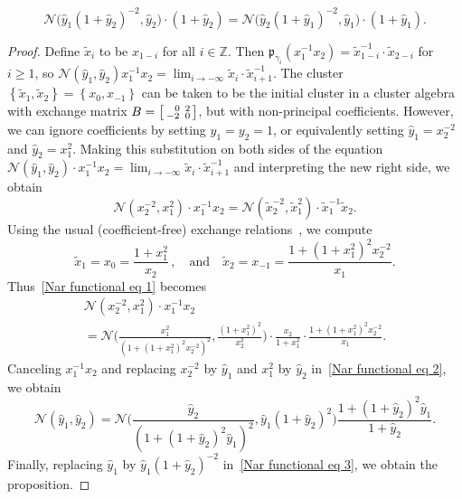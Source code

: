 \documentclass[ALCO,ThmDefs,Unicode,epreuves]{cedram}
\newcommand{\integers}{\mathbb Z}
\newcommand{\set}[1]{{\left\lbrace #1 \right\rbrace}}
\newcommand{\N}{{\mathcal N}}
\newcommand{\p}{{\mathfrak p}}
\newcommand{\hy}{\hat{y}}
\begin{document}
\begin{prop}\label{Nar fun}
\begin{equation}\label{Nar fun eq}
\N\bigl(\hy_1(1+\hy_2)^{-2},\hy_2\bigr)\cdot(1+\hy_2)=\N\bigl(\hy_2(1+\hy_1)^{-2},\hy_1\bigr)\cdot(1+\hy_1).
\end{equation}
\end{prop}
\begin{proof}
Define $\tilde{x}_i$ to be $x_{1-i}$ for all $i\in\integers$.
Then $\p_{\gamma_i}(x_1^{-1}x_2)=\tilde{x}_{1-i}^{-1}\cdot\tilde{x}_{2-i}$ for $i\ge 1$, so $\N(\hy_1,\hy_2)x_1^{-1}x_2=\lim_{i\to-\infty}\tilde{x}_i\cdot\tilde{x}_{i+1}^{-1}$.
The cluster $\set{\tilde{x}_1,\tilde{x}_2}=\set{x_0,x_{-1}}$ can be taken to be the initial cluster in a cluster algebra with exchange matrix $B=\begin{bsmallmatrix}\,\,\,\,\,0&\,2\\-2&\,0\end{bsmallmatrix}$, but with non-principal coefficients.
However, we can ignore coefficients by setting $y_1=y_2=1$, or equivalently setting $\hy_1=x_2^{-2}$ and $\hy_2=x_1^2$.
Making this substitution on both sides of the equation $\N(\hy_1,\hy_2)\cdot x_1^{-1}x_2=\lim_{i\to-\infty}\tilde{x}_i\cdot\tilde{x}_{i+1}^{-1}$ and interpreting the new right side, we obtain
\begin{equation}\label{Nar functional eq 1}
\N(x_2^{-2},x_1^2)\cdot x_1^{-1}x_2=\N(\tilde{x}_2^{-2},\tilde{x}_1^2)\cdot\tilde{x}_1^{-1}\tilde{x}_2.
\end{equation}
Using the usual (coefficient-free) exchange relations~\cite[(2.15)]{ca4}, we compute
\[\tilde{x}_1=x_0=\frac{1+x_1^2}{x_2}\,,\quad\text{and}\quad\tilde{x}_2=x_{-1}=\frac{1+(1+x_1^2)^2x_2^{-2}}{x_1}.\]
Thus~\eqref{Nar functional eq 1} becomes
\begin{multline}\label{Nar functional eq 2}
\N(x_2^{-2},x_1^2)\cdot x_1^{-1}x_2\\=\N\biggl(\frac{x_1^2}{(1+(1+x_1^2)^2x_2^{-2})^2},\frac{(1+x_1^2)^2}{x_2^2}\biggr)\cdot\frac{x_2}{1+x_1^2}\cdot\frac{1+(1+x_1^2)^2x_2^{-2}}{x_1}.
\end{multline}
Canceling $x_1^{-1}x_2$ and replacing $x_2^{-2}$ by $\hy_1$ and $x_1^2$ by $\hy_2$ in~\eqref{Nar functional eq 2}, we obtain
\begin{equation}\label{Nar functional eq 3}
\N(\hy_1,\hy_2)=\N\biggl(\frac{\hy_2}{(1+(1+\hy_2)^2\hy_1)^2},\hy_1(1+\hy_2)^2\biggr)\frac{1+(1+\hy_2)^2\hy_1}{1+\hy_2}.
\end{equation}
Finally, replacing $\hy_1$ by $\hy_1(1+\hy_2)^{-2}$ in~\eqref{Nar functional eq 3}, we obtain
the proposition.
\end{proof}
\end{document}
